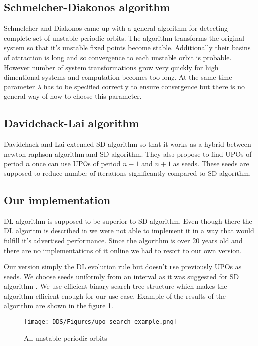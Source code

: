 \subsection{Schmelcher-Diakonos algorithm}
Schmelcher and Diakonos came up with a general algorithm for detecting complete set of unstable periodic orbits.
The algorithm transforms the original system so that it's unstable fixed points become stable.
Additionally their basins of attraction is long and so convergence to each unstable orbit is probable.
However number of system transformations grow very quickly for high dimentional systems and computation becomes too long.
At the same time parameter $\lambda$ has to be specified correctly to ensure convergence but there is no general way of how to choose this parameter. \cite{Schmelcher1997}

\subsection{Davidchack-Lai algorithm}
Davidchack and Lai extended SD algorithm so that it works as a hybrid between newton-raphson algorithm and SD algorithm.
They also propose to find UPOs of period $n$ once can use UPOs of period $n-1$ and $n+1$ as seeds.
These seeds are supposed to reduce number of iterations significantly compared to SD algorithm. \cite{Davidchack1999}

\subsection{Our implementation}
DL algorithm is supposed to be superior to SD algorithm.
Even though there the DL algoritm is described in \cite{Davidchack1999,Davidchack2001,Klebanoff2001} we were not able to implement it in a way that would fulfill it's advertised performance.
Since the algorithm is over 20 years old and there are no implementations of it online we had to resort to our own version.
\par
Our version simply the DL evolution rule but doesn't use previously UPOs as seeds.
We choose seeds uniformly from an interval as it was suggested for SD algorithm \cite{Schmelcher1997}.
We use efficient binary search tree structure which makes the algorithm efficient enough for our use case.
Example of the results of the algorithm are shown in the figure \ref{fig:upo_search_example}.

\begin{figure}[!h]
    \centering
    \texttt{[image: DDS/Figures/upo\_search\_example.png]}
    \caption{All unstable periodic orbits}
    \label{fig:upo_search_example}
\end{figure}


